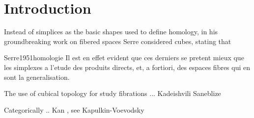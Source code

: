 
\section{Introduction} \label{s:introduction}

Instead of simplices as the basic shapes used to define homology, in his groundbreaking work on fibered spaces Serre considered cubes, stating that

\begin{displaycquote}[p.431]{Serre1951homologie}
	Il est en effet evident que ces derniers se pretent mieux que les simplexes a l'etude des produits directs, et, a fortiori, des espaces fibres qui en sont la generalisation.
\end{displaycquote}

The use of cubical topology for study fibrations ... Kadeishvili Saneblize

Categorically .. Kan , see Kapulkin-Voevodsky